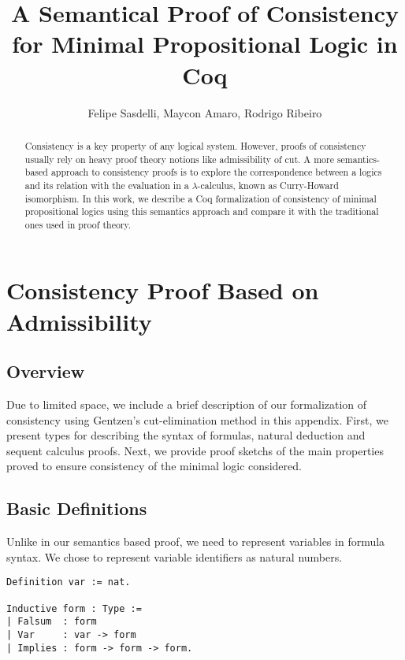 \documentclass[12pt]{article}
\title{A Semantical Proof of Consistency for Minimal Propositional Logic in Coq}
\author{Felipe Sasdelli\inst{1}, Maycon Amaro\inst{1}, Rodrigo Ribeiro\inst{1}}
\theoremstyle{definition}
\begin{document}
 

\maketitle

\begin{abstract}
  Consistency is a key property of any logical system. However, proofs of
  consistency usually rely on heavy proof theory notions like admissibility
  of cut. A more semantics-based approach to consistency proofs is to explore the
  correspondence between a logics and its relation with the
  evaluation in a $\lambda$-calculus, known as Curry-Howard isomorphism.
  In this work, we describe a Coq formalization of consistency of minimal
  propositional logics using this semantics approach and compare it with 
  the traditional ones used in proof theory.
\end{abstract}






\appendix

\section{Consistency Proof Based on Admissibility}

\subsection{Overview}

Due to limited space, we include a brief description of our formalization of
consistency using Gentzen's cut-elimination method in this appendix. First, we
present types for describing the syntax of formulas, natural deduction
and sequent calculus proofs. Next, we provide proof sketchs of the main
properties proved to ensure consistency of the minimal logic considered.

\subsection{Basic Definitions}

Unlike in our semantics based proof, we need to represent variables in
formula syntax. We chose to represent variable identifiers as natural
numbers.

\begin{lstlisting}
Definition var := nat.

Inductive form : Type :=
| Falsum  : form 
| Var     : var -> form
| Implies : form -> form -> form.
\end{lstlisting}
\end{document}
